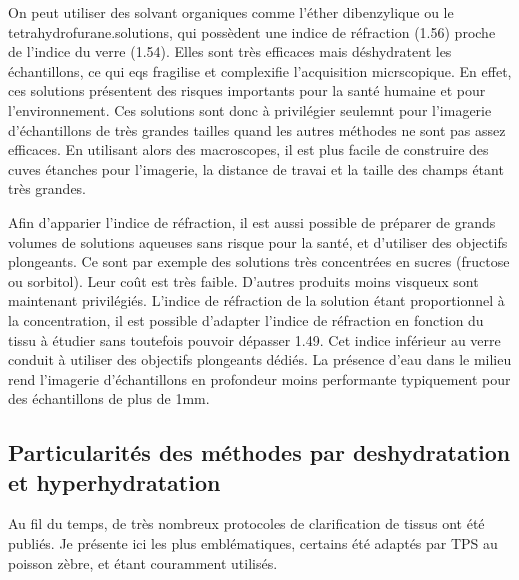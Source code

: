 \documentclass[\main/main.tex]{subfiles}
\begin{document}
%
On peut utiliser des solvant organiques comme l'éther dibenzylique ou le tetrahydrofurane.solutions, qui possèdent une indice de réfraction (1.56) proche de l'indice du verre (1.54).
%
Elles sont très efficaces mais déshydratent les échantillons, ce qui eqs fragilise et complexifie l'acquisition micrscopique. En effet, ces solutions présentent des risques importants pour la santé humaine et pour l'environnement.
%
Ces solutions sont donc à privilégier seulemnt pour l'imagerie d'échantillons de très grandes tailles quand les autres méthodes ne sont pas assez efficaces. En utilisant alors des macroscopes, il est plus facile de construire des cuves étanches pour l'imagerie, la distance de travai et la taille des champs étant très grandes. 

%
Afin d'apparier l'indice de réfraction, il est aussi possible de préparer de grands volumes de solutions aqueuses sans risque pour la santé, et d'utiliser des objectifs plongeants. Ce sont par exemple des solutions très concentrées en sucres (fructose ou sorbitol). Leur coût est très faible. D'autres produits moins visqueux sont maintenant privilégiés.
%
L'indice de réfraction de la solution étant proportionnel à la concentration, il est possible d'adapter l'indice de réfraction en fonction du tissu à étudier  sans toutefois pouvoir dépasser 1.49. Cet indice inférieur au verre conduit à utiliser des objectifs plongeants dédiés. La présence d'eau dans le milieu rend l'imagerie d'échantillons en profondeur moins performante typiquement pour des échantillons de plus de 1mm.

\subsection{Particularités des méthodes par deshydratation et hyperhydratation}

%
Au fil du temps, de très nombreux protocoles de clarification de tissus ont été publiés. Je présente ici les plus emblématiques, certains été adaptés par TPS au poisson zèbre, et étant couramment utilisés.
%

\end{document}

